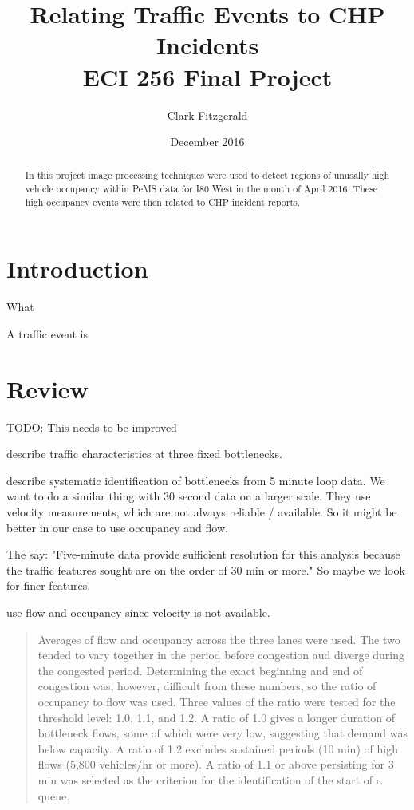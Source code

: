 \documentclass[12pt]{article}
\begin{document}
\title{Relating Traffic Events to CHP Incidents\\
ECI 256 Final Project}
\date{December 2016}
\author{Clark Fitzgerald}
\maketitle

\begin{abstract}

In this project image processing techniques were used to detect regions of
    unusally high vehicle occupancy 
within PeMS data for I80 West in the month of April 2016. 
These high occupancy events were then related to CHP incident reports.

\end{abstract}

\section{Introduction}

What 

A traffic event is 

\section{Review}

TODO: This needs to be improved

\cite{chung2007relation} describe traffic characteristics at three fixed bottlenecks.

\cite{chen2004systematic} describe systematic identification of bottlenecks from 5
minute loop data. We want to do a similar thing with 30 second data on a larger scale.
They use velocity measurements, which are not always reliable / available. So it might be 
better in our case to use occupancy and flow.

The say: "Five-minute data provide sufficient
resolution for this analysis because the traffic features sought are on
the order of 30 min or more." So maybe we look for finer features.

\cite{hall1991freeway} use flow and occupancy since velocity is not available.

\begin{quote}
Averages of flow and occupancy across the three lanes were
used. The two tended to vary together in the period before
congestion aud diverge during the congested period. Determining
the exact beginning and end of congestion was,
however, difficult from these numbers, so the ratio of occupancy
to flow was used. Three values of the ratio were tested
for the threshold level: 1.0, 1.1, and 1.2. A ratio of 1.0 gives
a longer duration of bottleneck flows, some of which were
very low, suggesting that demand was below capacity. A ratio
of 1.2 excludes sustained periods (10 min) of high flows (5,800
vehicles/hr or more). A ratio of 1.1 or above persisting for 3
min was selected as the criterion for the identification of the
start of a queue. 
\end{quote}
\end{document}
